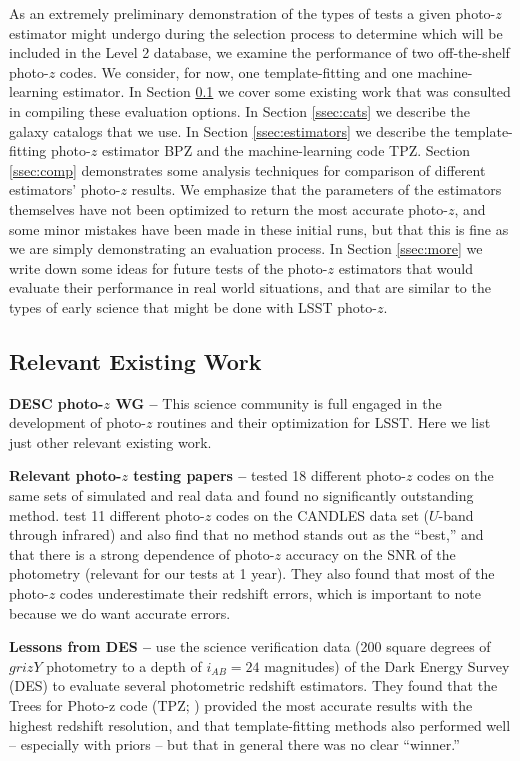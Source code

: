 \documentclass[DM,lsstdraft,toc]{lsstdoc}
\begin{document}
As an extremely preliminary demonstration of the types of tests a given photo-$z$ estimator might undergo during the selection process to determine which will be included in the Level 2 database, we examine the performance of two off-the-shelf photo-$z$ codes. We consider, for now, one template-fitting and one machine-learning estimator. In Section \ref{ssec:options_lit} we cover some existing work that was consulted in compiling these evaluation options. In Section \ref{ssec:cats} we describe the galaxy catalogs that we use. In Section \ref{ssec:estimators} we describe the template-fitting photo-$z$ estimator BPZ and the machine-learning code TPZ. Section \ref{ssec:comp} demonstrates some analysis techniques for comparison of different estimators' photo-$z$ results. We emphasize that the parameters of the estimators themselves have not been optimized to return the most accurate photo-$z$, and some minor mistakes have been made in these initial runs, but that this is fine as we are simply demonstrating an evaluation process. In Section \ref{ssec:more} we write down some ideas for future tests of the photo-$z$ estimators that would evaluate their performance in real world situations, and that are similar to the types of early science that might be done with LSST photo-$z$.


\subsection{Relevant Existing Work}\label{ssec:options_lit}

\textbf{DESC photo-$z$ WG --} This science community is full engaged in the development of photo-$z$ routines and their optimization for LSST. Here we list just other relevant existing work.

\textbf{Relevant photo-$z$ testing papers --} \cite{2010A&A...523A..31H} tested 18 different photo-$z$ codes on the same sets of simulated and real data and found no significantly outstanding method. \cite{2013ApJ...775...93D} test 11 different photo-$z$ codes on the CANDLES data set ($U$-band through infrared) and also find that no method stands out as the ``best,'' and that there is a strong dependence of photo-$z$ accuracy on the SNR of the photometry (relevant for our tests at 1 year). They also found that most of the photo-$z$ codes underestimate their redshift errors, which is important to note because we do want accurate errors.

\textbf{Lessons from DES --} \cite{2014MNRAS.445.1482S} use the science verification data (200 square degrees of $grizY$ photometry to a depth of $i_{AB}=24$ magnitudes) of the Dark Energy Survey (DES) to evaluate several photometric redshift estimators. They found that the Trees for Photo-z code (TPZ; \citealt{2013ascl.soft04011C}) provided the most accurate results with the highest redshift resolution, and that template-fitting methods also performed well -- especially with priors -- but that in general there was no clear ``winner.''
\end{document}
